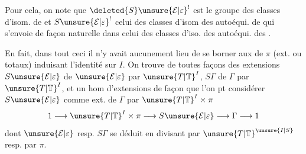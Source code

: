 Pour cela, on note que $\deleted{S}\unsure{\mathcal E|\varepsilon}^{!}$ est le groupe des classes d'isom.  de
et $S\unsure{\mathcal E|\varepsilon}^{!}$ celui des classes d'isom des  autoéqui. de
qui s'envoie de façon naturelle dans celui des classes d'iso. des autoéqui. des 
.


En fait, dans tout ceci il n'y avait aucunement lieu de se borner aux   de $\pi$ (ext. ou totaux) induisant l'identité sur $I$. On trouve de toutes façons des extensions $S\unsure{\mathcal E|\varepsilon}$ de $\unsure{\mathcal E|\varepsilon}$ par $\unsure{T|\mathbb T}^I$, $S\Gamma$ de $\Gamma$ par $\unsure{T|\mathbb T}^I$, et un hom d'extensions
de façon que l'on pt considérer $S\unsure{\mathcal E|\varepsilon}$ comme ext. de $\Gamma$ par $\unsure{T|\mathbb T}^I\times\pi$
\[
1\longrightarrow \unsure{T|\mathbb T}^I\times\pi\longrightarrow S\unsure{\mathcal E|\varepsilon}\longrightarrow\Gamma\longrightarrow1
\]
dont  $\unsure{\mathcal E|\varepsilon}$ resp. $S\Gamma$ se déduit en divisant par $\unsure{T|\mathbb T}^{\unsure{I|S}}$ resp. par $\pi$.

